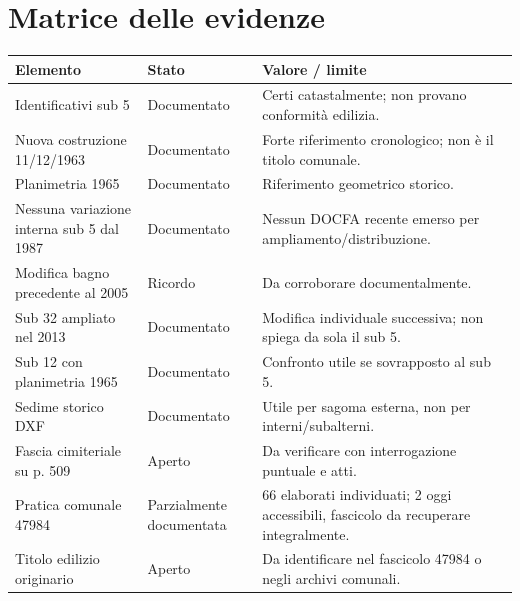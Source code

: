 \documentclass[11pt,a4paper]{article}
\begin{document}
\section{Matrice delle evidenze}
\begin{tabularx}{\textwidth}{p{4cm}p{2.6cm}X}\toprule
\textbf{Elemento}&\textbf{Stato}&\textbf{Valore / limite}\\\midrule
Identificativi sub 5 & Documentato & Certi catastalmente; non provano conformità edilizia.\\
Nuova costruzione 11/12/1963 & Documentato & Forte riferimento cronologico; non è il titolo comunale.\\
Planimetria 1965 & Documentato & Riferimento geometrico storico.\\
Nessuna variazione interna sub 5 dal 1987 & Documentato & Nessun DOCFA recente emerso per ampliamento/distribuzione.\\
Modifica bagno precedente al 2005 & Ricordo & Da corroborare documentalmente.\\
Sub 32 ampliato nel 2013 & Documentato & Modifica individuale successiva; non spiega da sola il sub 5.\\
Sub 12 con planimetria 1965 & Documentato & Confronto utile se sovrapposto al sub 5.\\
Sedime storico DXF & Documentato & Utile per sagoma esterna, non per interni/subalterni.\\
Fascia cimiteriale su p. 509 & Aperto & Da verificare con interrogazione puntuale e atti.\\
Pratica comunale 47984 & Parzialmente documentata & 66 elaborati individuati; 2 oggi accessibili, fascicolo da recuperare integralmente.\\
Titolo edilizio originario & Aperto & Da identificare nel fascicolo 47984 o negli archivi comunali.\\
\bottomrule\end{tabularx}
\end{document}

